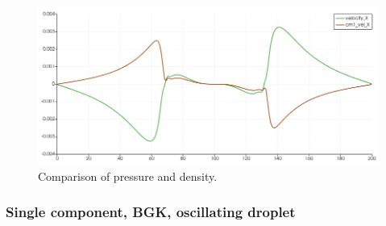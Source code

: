 \documentclass{article}
\begin{document}
	\begin{figure}[h]
		\centering
		\includegraphics[scale=0.3]{pics/MRT_StaticDroplet_VelProf.png}
		\caption{Comparison of pressure and density.}
		\label{fig:MRT_StaticVelProf}
	\end{figure}
	
	\subsubsection{Single component, BGK, oscillating droplet}
	
\end{document}
